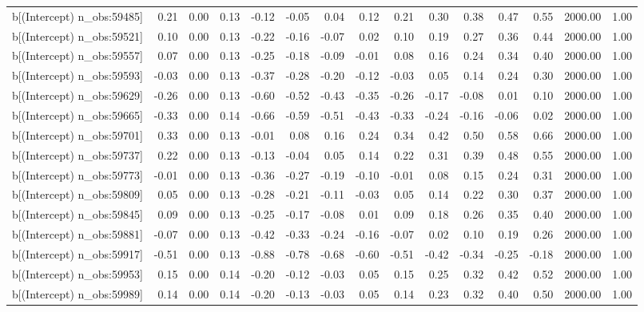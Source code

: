 \begin{table}[ht]
\begin{tabular}{rrrrrrrrrrrrrrr}
  b[(Intercept) n\_obs:59485] & 0.21 & 0.00 & 0.13 & -0.12 & -0.05 & 0.04 & 0.12 & 0.21 & 0.30 & 0.38 & 0.47 & 0.55 & 2000.00 & 1.00 \\ 
  b[(Intercept) n\_obs:59521] & 0.10 & 0.00 & 0.13 & -0.22 & -0.16 & -0.07 & 0.02 & 0.10 & 0.19 & 0.27 & 0.36 & 0.44 & 2000.00 & 1.00 \\ 
  b[(Intercept) n\_obs:59557] & 0.07 & 0.00 & 0.13 & -0.25 & -0.18 & -0.09 & -0.01 & 0.08 & 0.16 & 0.24 & 0.34 & 0.40 & 2000.00 & 1.00 \\ 
  b[(Intercept) n\_obs:59593] & -0.03 & 0.00 & 0.13 & -0.37 & -0.28 & -0.20 & -0.12 & -0.03 & 0.05 & 0.14 & 0.24 & 0.30 & 2000.00 & 1.00 \\ 
  b[(Intercept) n\_obs:59629] & -0.26 & 0.00 & 0.13 & -0.60 & -0.52 & -0.43 & -0.35 & -0.26 & -0.17 & -0.08 & 0.01 & 0.10 & 2000.00 & 1.00 \\ 
  b[(Intercept) n\_obs:59665] & -0.33 & 0.00 & 0.14 & -0.66 & -0.59 & -0.51 & -0.43 & -0.33 & -0.24 & -0.16 & -0.06 & 0.02 & 2000.00 & 1.00 \\ 
  b[(Intercept) n\_obs:59701] & 0.33 & 0.00 & 0.13 & -0.01 & 0.08 & 0.16 & 0.24 & 0.34 & 0.42 & 0.50 & 0.58 & 0.66 & 2000.00 & 1.00 \\ 
  b[(Intercept) n\_obs:59737] & 0.22 & 0.00 & 0.13 & -0.13 & -0.04 & 0.05 & 0.14 & 0.22 & 0.31 & 0.39 & 0.48 & 0.55 & 2000.00 & 1.00 \\ 
  b[(Intercept) n\_obs:59773] & -0.01 & 0.00 & 0.13 & -0.36 & -0.27 & -0.19 & -0.10 & -0.01 & 0.08 & 0.15 & 0.24 & 0.31 & 2000.00 & 1.00 \\ 
  b[(Intercept) n\_obs:59809] & 0.05 & 0.00 & 0.13 & -0.28 & -0.21 & -0.11 & -0.03 & 0.05 & 0.14 & 0.22 & 0.30 & 0.37 & 2000.00 & 1.00 \\ 
  b[(Intercept) n\_obs:59845] & 0.09 & 0.00 & 0.13 & -0.25 & -0.17 & -0.08 & 0.01 & 0.09 & 0.18 & 0.26 & 0.35 & 0.40 & 2000.00 & 1.00 \\ 
  b[(Intercept) n\_obs:59881] & -0.07 & 0.00 & 0.13 & -0.42 & -0.33 & -0.24 & -0.16 & -0.07 & 0.02 & 0.10 & 0.19 & 0.26 & 2000.00 & 1.00 \\ 
  b[(Intercept) n\_obs:59917] & -0.51 & 0.00 & 0.13 & -0.88 & -0.78 & -0.68 & -0.60 & -0.51 & -0.42 & -0.34 & -0.25 & -0.18 & 2000.00 & 1.00 \\ 
  b[(Intercept) n\_obs:59953] & 0.15 & 0.00 & 0.14 & -0.20 & -0.12 & -0.03 & 0.05 & 0.15 & 0.25 & 0.32 & 0.42 & 0.52 & 2000.00 & 1.00 \\ 
  b[(Intercept) n\_obs:59989] & 0.14 & 0.00 & 0.14 & -0.20 & -0.13 & -0.03 & 0.05 & 0.14 & 0.23 & 0.32 & 0.40 & 0.50 & 2000.00 & 1.00 \\ 

\end{tabular}
\end{table}
